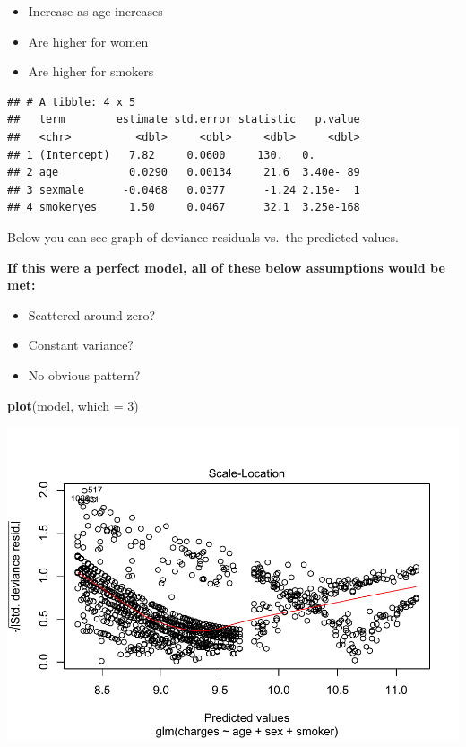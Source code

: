 \documentclass[openany]{book}
\newenvironment{Shaded}{\begin{snugshade}}{\end{snugshade}}
\newcommand{\DataTypeTok}[1]{\textcolor[rgb]{0.13,0.29,0.53}{#1}}
\newcommand{\DecValTok}[1]{\textcolor[rgb]{0.00,0.00,0.81}{#1}}
\newcommand{\KeywordTok}[1]{\textcolor[rgb]{0.13,0.29,0.53}{\textbf{#1}}}
\newcommand{\NormalTok}[1]{#1}
\newcommand{\OperatorTok}[1]{\textcolor[rgb]{0.81,0.36,0.00}{\textbf{#1}}}
\newcommand{\StringTok}[1]{\textcolor[rgb]{0.31,0.60,0.02}{#1}}
\providecommand{\tightlist}{%
  \setlength{\itemsep}{0pt}\setlength{\parskip}{0pt}}
\begin{document}
\begin{itemize}
\tightlist
\item
  Increase as age increases
\item
  Are higher for women
\item
  Are higher for smokers
\end{itemize}

\begin{Shaded}
\end{Shaded}

\begin{verbatim}
## # A tibble: 4 x 5
##   term        estimate std.error statistic   p.value
##   <chr>          <dbl>     <dbl>     <dbl>     <dbl>
## 1 (Intercept)   7.82     0.0600     130.   0.       
## 2 age           0.0290   0.00134     21.6  3.40e- 89
## 3 sexmale      -0.0468   0.0377      -1.24 2.15e-  1
## 4 smokeryes     1.50     0.0467      32.1  3.25e-168
\end{verbatim}

Below you can see graph of deviance residuals vs.~the predicted values.

\textbf{If this were a perfect model, all of these below assumptions would be met:}

\begin{itemize}
\tightlist
\item
  Scattered around zero?
\item
  Constant variance?
\item
  No obvious pattern?
\end{itemize}

\begin{Shaded}
\begin{Highlighting}[]
\KeywordTok{plot}\NormalTok{(model, }\DataTypeTok{which =} \DecValTok{3}\NormalTok{)}
\end{Highlighting}
\end{Shaded}

\includegraphics{05-linear-models_files/figure-latex/unnamed-chunk-17-1.pdf}
\end{document}
